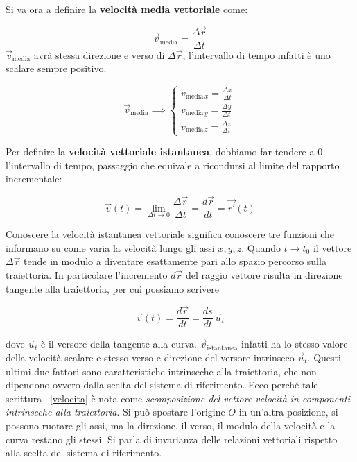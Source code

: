 Si va ora a definire la \textbf{velocità media vettoriale} come:

\[
	\vec{v}_{\text{media}}=\frac{\Delta\vec{r}}{\Delta t}
\]
$\vec{v}_{\text{media}}$ avrà stessa direzione e verso di $\Delta\vec{r}$, l'intervallo di tempo infatti è uno scalare sempre positivo.

\[
	\vec{v}_{\text{media}}\implies \begin{cases} v_{\text{media} \,x} =\frac{\Delta x}{\Delta t} \\ v_{\text{media} \,y} =\frac{\Delta y}{\Delta t} \\ v_{\text{media} \,z} =\frac{\Delta z}{\Delta t} \end{cases}
\]

Per definire la \textbf{velocità vettoriale istantanea}, dobbiamo far tendere a $0$ l'intervallo di tempo, passaggio che equivale a ricondursi al limite del rapporto incrementale:

\[
	\vec{v}(t)=\lim_{\Delta t \to 0} \frac{\Delta \vec{r}}{\Delta t}=\frac{d\vec{r}}{dt}=\vec{r'}(t)
\]

Conoscere la velocità istantanea vettoriale significa conoscere tre funzioni che informano su come varia la velocità lungo gli assi $x, y, z$. Quando $t \to t_0$ il vettore $\Delta\vec{r}$ tende in modulo a diventare esattamente pari allo spazio percorso sulla traiettoria. In particolare l'incremento $d\vec{r}$ del raggio vettore risulta in direzione tangente alla traiettoria, per cui possiamo scrivere

\begin{equation}
	\label{velocita}
	\boxed{\vec{v}(t)=\frac{d\vec{r}}{dt}=\frac{ds}{dt}\,\vec{u}_t}
\end{equation}

dove $\vec{u}_t$ è il versore della tangente alla curva. $\vec{v}_\text{istantanea}$ infatti ha lo stesso valore della velocità scalare e stesso verso e direzione del versore intrinseco $\vec{u}_t$.
Questi ultimi due fattori sono caratteristiche intrinseche alla traiettoria, che non dipendono ovvero dalla scelta del sistema di riferimento. Ecco perché tale scrittura ~\eqref{velocita} è nota come \textit{scomposizione del vettore velocità in componenti intrinseche alla traiettoria}.
Si può spostare l'origine $O$ in un'altra posizione, si possono ruotare gli assi, ma la direzione, il verso, il modulo della velocità e la curva restano gli stessi. Si parla di invarianza delle relazioni vettoriali rispetto alla scelta del sistema di riferimento.

